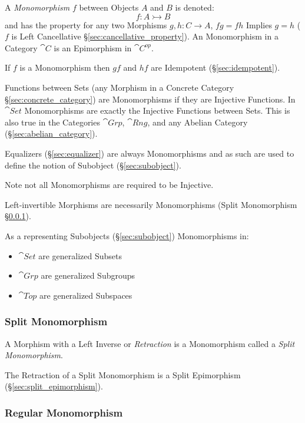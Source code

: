 A \emph{Monomorphism} $f$ between Objects $A$ and $B$ is denoted:
\[
  f : A \rightarrowtail B
\]
and has the property for any two Morphisms $g, h : C \rightarrow A$,
$fg = fh$ Implies $g = h$ ($f$ is Left Cancellative
\S\ref{sec:cancellative_property}). An Monomorphism in a Category
$\cat{C}$ is an Epimorphism in $\cat{C^{op}}$.

If $f$ is a Monomorphism then $gf$ and $hf$ are Idempotent
(\S\ref{sec:idempotent}). %

Functions between Sets (any Morphism in a Concrete Category
\S\ref{sec:concrete_category}) are Monomorphisms if they are Injective
Functions. In $\cat{Set}$ Monomorphisms are exactly the Injective
Functions between Sets. This is also true in the Categories
$\cat{Grp}$, $\cat{Rng}$, and any Abelian Category
(\S\ref{sec:abelian_category}).

Equalizers (\S\ref{sec:equalizer}) are always Monomorphisms and as
such are used to define the notion of Subobject
(\S\ref{sec:subobject}).

\HandRight\; Note not all Monomorphisms are required to be Injective.

Left-invertible Morphisms are necessarily Monomorphisms (Split
Monomorphism \S\ref{sec:split_monomorphism}).

As a representing Subobjects (\S\ref{sec:subobject}) Monomorphisms in:
\begin{itemize}
  \item $\cat{Set}$ are generalized Subsets
  \item $\cat{Grp}$ are generalized Subgroups
  \item $\cat{Top}$ are generalized Subspaces
\end{itemize}



\subsubsection{Split Monomorphism}\label{sec:split_monomorphism}

A Morphism with a Left Inverse or \emph{Retraction} is a Monomorphism
called a \emph{Split Monomorphism}.

The Retraction of a Split Monomorphism is a Split Epimorphism
(\S\ref{sec:split_epimorphism}).



\subsubsection{Regular Monomorphism}\label{sec:regular_monomorphism}

